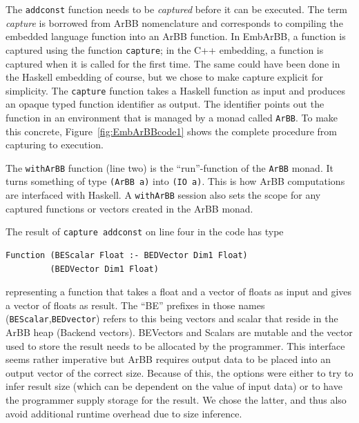 The {\tt addconst} function needs to be {\em captured} before it can be executed. 
The term {\em capture} is borrowed from ArBB nomenclature and corresponds to compiling 
the embedded language function into an ArBB function. In EmbArBB, a function is 
captured using the function {\tt capture}; in the C++ embedding, a function is 
captured when it is called for the first time. The same could have been done in 
the Haskell embedding of course, but we chose to make
capture explicit for simplicity.
The {\tt capture} function takes a Haskell function as input and produces an 
opaque typed function identifier as output. The identifier points out the function 
in an environment that is managed by a monad called {\tt ArBB}. To make this 
concrete, Figure~\ref{fig:EmbArBBcode1} shows the complete procedure from capturing 
to execution.  

 
The {\tt withArBB} function (line two) is the ``run''-function of the {\tt ArBB} monad. 
It turns something of type {\tt (ArBB a)} into {\tt (IO a)}. This is how ArBB 
computations are interfaced with Haskell. A {\tt withArBB} session also sets the scope 
for any captured functions or vectors created in the ArBB monad.

The result of {\tt capture addconst} on line four in the code has type 
\begin{verbatim}
Function (BEScalar Float :- BEDVector Dim1 Float) 
         (BEDVector Dim1 Float)
\end{verbatim}
representing a function that takes a float and a vector of floats as 
input and gives a vector of floats as result. The ``BE'' prefixes 
in those names ({\tt BEScalar},{\tt BEDvector}) refers to this being vectors and scalar that 
reside in the ArBB heap (Backend vectors). BEVectors and Scalars are mutable and the 
vector used to store the result needs to be allocated by the programmer. This interface 
seems rather imperative but ArBB requires output data to be
placed into an output vector of the correct size. 
Because of this, the options were either to try to infer result size (which can be dependent on the value of input data) or to have the programmer
supply storage for the result. We chose the latter, and thus also avoid
additional runtime overhead due to size inference.

